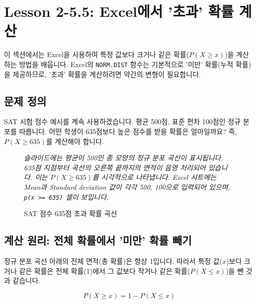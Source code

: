 \documentclass[11pt,a4paper]{article}
\begin{document}
\newpage
\section{Lesson 2-5.5: Excel에서 '초과' 확률 계산}

이 섹션에서는 Excel을 사용하여 특정 값보다 크거나 같은 확률($P(X \ge x)$)을 계산하는 방법을 배웁니다.
Excel의 \texttt{NORM.DIST} 함수는 기본적으로 '미만' 확률(누적 확률)을 제공하므로, '초과' 확률을 계산하려면 약간의 변형이 필요합니다.

\subsection{문제 정의}
SAT 시험 점수 예시를 계속 사용하겠습니다. 평균 500점, 표준 편차 100점인 정규 분포를 따릅니다.
어떤 학생이 635점보다 높은 점수를 받을 확률은 얼마일까요?
즉, $P(X \ge 635)$를 계산해야 합니다.

\begin{figure}[h!]
    \centering
    \caption{SAT 점수 635점 초과 확률 곡선}
    \label{fig:sat_greater_than}
    \vspace{0.5em}
    \textit{슬라이드에는 평균이 500인 종 모양의 정규 분포 곡선이 표시됩니다. 635점 지점부터 곡선의 오른쪽 끝까지의 면적이 음영 처리되어 있습니다. 이는 $P(X \ge 635)$를 시각적으로 나타냅니다. Excel 시트에는 Mean과 Standard deviation 값이 각각 500, 100으로 입력되어 있으며, \texttt{p(x >= 635)} 셀이 보입니다.}
\end{figure}

\subsection{계산 원리: 전체 확률에서 '미만' 확률 빼기}
정규 분포 곡선 아래의 전체 면적(총 확률)은 항상 1입니다.
따라서 특정 값($x$)보다 크거나 같은 확률은 전체 확률(1)에서 그 값보다 작거나 같은 확률($P(X \le x)$)을 뺀 것과 같습니다.

\begin{equation*}
    P(X \ge x) = 1 - P(X \le x)
\end{equation*}
\end{document}
